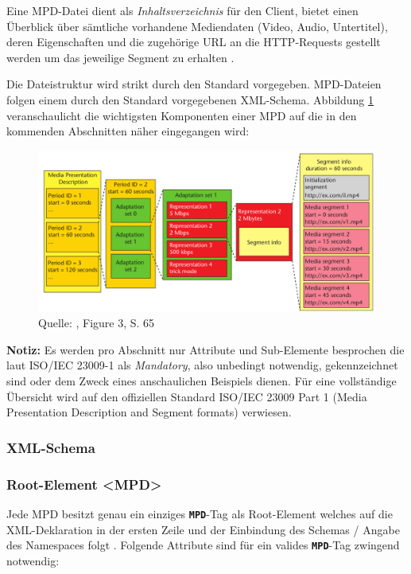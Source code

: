 \documentclass[paper = a4, fontsize = 12pt, parskip = half]{scrartcl} %
\def\elem#1{\texttt{\textbf{#1}}}
\begin{document}
Eine MPD-Datei dient als \textit{Inhaltsverzeichnis} für den Client, bietet einen Überblick über sämtliche vorhandene Mediendaten (Video, Audio, Untertitel), deren Eigenschaften und die zugehörige URL an die HTTP-Requests gestellt werden um das jeweilige Segment zu erhalten \cite{international_organization_for_standardization_isoiec_nodate}.

Die Dateistruktur wird strikt durch den Standard vorgegeben. MPD-Dateien folgen einem durch den Standard vorgegebenen XML-Schema. Abbildung \ref{mpd_components} veranschaulicht die wichtigsten Komponenten einer MPD auf die in den kommenden Abschnitten näher eingegangen wird:

	\begin{figure}[ht]
		\centering
		\includegraphics[width=12cm]{images/mpd-structure.png}
		\caption{Quelle: \cite{sodagar_mpeg-dash_2011}, Figure 3, S. 65}
		\label{mpd_components}
	\end{figure}

\textbf{Notiz:} Es werden pro Abschnitt nur Attribute und Sub-Elemente besprochen die laut ISO/IEC 23009-1 als \textit{Mandatory}, also unbedingt notwendig, gekennzeichnet sind oder dem Zweck eines anschaulichen Beispiels dienen. Für eine vollständige Übersicht wird auf den offiziellen Standard ISO/IEC 23009 Part 1 (Media Presentation Description and Segment formats) verwiesen.

\subsubsection{XML-Schema}

\subsubsection{Root-Element <MPD>}
Jede MPD besitzt genau ein einziges \elem{MPD}-Tag als Root-Element welches auf die XML-Deklaration in der ersten Zeile und der Einbindung des Schemas / Angabe des Namespaces folgt \cite{international_organization_for_standardization_isoiec_nodate}.
Folgende Attribute sind für ein valides \elem{MPD}-Tag zwingend notwendig:
\end{document}
